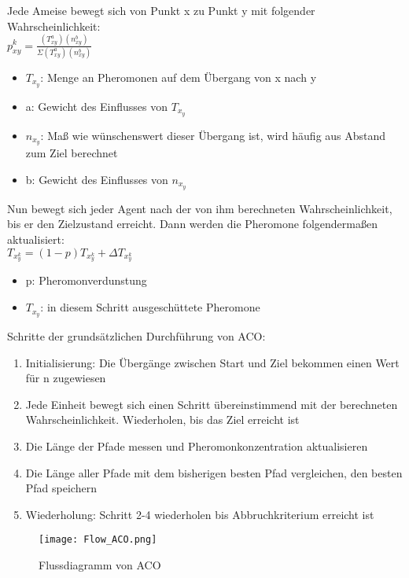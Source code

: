 Jede Ameise bewegt sich von Punkt x zu Punkt y mit folgender Wahrscheinlichkeit:\\
\large$p_{xy}^k=\frac{(T_{xy}^a)(n_{xy}^b)}{\Sigma(T_{xy}^a)(n_{xy}^b) }$

\begin{itemize}
  \item $T_x_y$: Menge an Pheromonen auf dem Übergang von x nach y 
  \item a: Gewicht des Einflusses von $T_x_y$
  \item $n_x_y$: Maß wie wünschenswert dieser Übergang ist, wird häufig aus Abstand zum Ziel berechnet
  \item b: Gewicht des Einflusses von $n_x_y$
\end{itemize}

Nun bewegt sich jeder Agent nach der von ihm berechneten Wahrscheinlichkeit, bis er den Zielzustand erreicht. Dann werden die Pheromone folgendermaßen aktualisiert:\\
$T_x_y^k=(1-p)T_x_y^k+\Delta T_x_y^k$
\begin{itemize}
  \item p: Pheromonverdunstung
  \item \delta $T_x_y$: in diesem Schritt ausgeschüttete Pheromone
\end{itemize}
Schritte der grundsätzlichen Durchführung von ACO:
\begin{enumerate}
  \item Initialisierung: Die Übergänge zwischen Start und Ziel bekommen einen Wert für n zugewiesen
  \item Jede Einheit bewegt sich einen Schritt übereinstimmend mit der berechneten Wahrscheinlichkeit.  Wiederholen, bis das Ziel erreicht ist
  \item Die Länge der Pfade messen und Pheromonkonzentration aktualisieren
  \item Die Länge aller Pfade mit dem bisherigen besten Pfad vergleichen, den besten Pfad speichern
  \item Wiederholung: Schritt 2-4 wiederholen bis Abbruchkriterium erreicht ist
\end{enumerate}

\begin{figure}
  \centering
  \texttt{[image: Flow\_ACO.png]}
  \caption{Flussdiagramm von ACO}
  \label{fig:Figure_ACO}
\end{figure}

